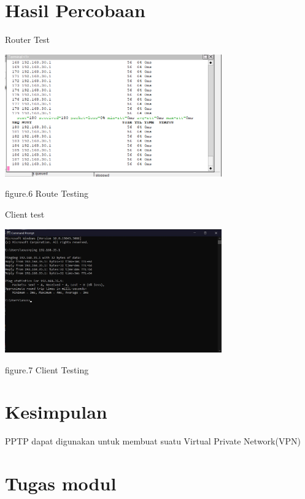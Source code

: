 \section{Hasil Percobaan}

Router Test
    
\begin{center}
    \includegraphics[width=0.7\textwidth]{image/P4/route-test.png}    
    
    figure.6 Route Testing
\end{center}

Client test

\begin{center}
    \includegraphics[width=0.7\textwidth]{image/P4/client-test.jpg}    
        
    figure.7 Client Testing
\end{center}

\section{Kesimpulan}

PPTP dapat digunakan untuk membuat suatu Virtual Private Network(VPN)

\section{Tugas modul}


